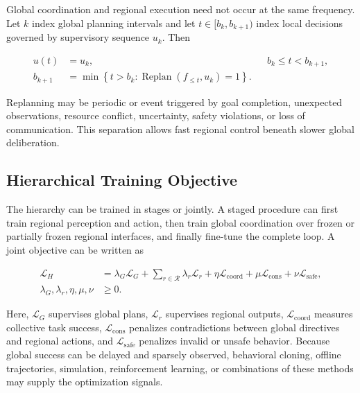 Global coordination and regional execution need not occur at the same frequency. Let $k$ index global planning intervals and let $t\in[b_k,b_{k+1})$ index local decisions governed by supervisory sequence $u_k$. Then

\begin{equation}
\begin{aligned}
    u(t)&=u_k,
    &&b_k\leq t<b_{k+1},\\
    b_{k+1}
    &=\min\left\{
       t>b_k:
       \operatorname{Replan}(f_{\leq t},u_k)=1
       \right\}.
\end{aligned}
\label{eq:hierarchical_timescale}
\end{equation}

Replanning may be periodic or event triggered by goal completion, unexpected observations, resource conflict, uncertainty, safety violations, or loss of communication. This separation allows fast regional control beneath slower global deliberation.

\subsection{\textbf{Hierarchical Training Objective}}

The hierarchy can be trained in stages or jointly. A staged procedure can first train regional perception and action, then train global coordination over frozen or partially frozen regional interfaces, and finally fine-tune the complete loop. A joint objective can be written as

\begin{equation}
\begin{aligned}
    \mathcal{L}_{H}
    &= \lambda_G\mathcal{L}_{G}
       +\sum_{r\in\mathcal{R}}
        \lambda_r\mathcal{L}_{r}
       +\eta\mathcal{L}_{\mathrm{coord}}
       +\mu\mathcal{L}_{\mathrm{cons}}
       +\nu\mathcal{L}_{\mathrm{safe}},\\
    \lambda_G,\lambda_r,\eta,\mu,\nu&\geq0.
\end{aligned}
\label{eq:hierarchical_loss}
\end{equation}

Here, $\mathcal{L}_{G}$ supervises global plans, $\mathcal{L}_{r}$ supervises regional outputs, $\mathcal{L}_{\mathrm{coord}}$ measures collective task success, $\mathcal{L}_{\mathrm{cons}}$ penalizes contradictions between global directives and regional actions, and $\mathcal{L}_{\mathrm{safe}}$ penalizes invalid or unsafe behavior. Because global success can be delayed and sparsely observed, behavioral cloning, offline trajectories, simulation, reinforcement learning, or combinations of these methods may supply the optimization signals.

